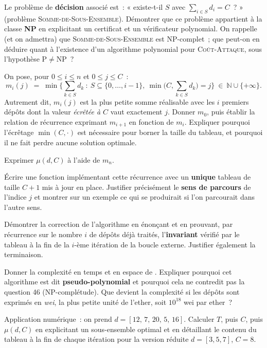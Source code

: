 \documentclass[11pt,a4paper]{article}
\begin{document}
\Q Le problème de \textbf{décision} associé est~: « existe-t-il $S$ avec
$\sum_{i\in S} d_i = C$~? » (problème \textsc{Somme-de-Sous-Ensemble}). Démontrer que ce
problème appartient à la classe \textbf{NP} en explicitant un certificat et un vérificateur
polynomial. On rappelle (et on admettra) que \textsc{Somme-de-Sous-Ensemble} est
NP-complet~; que peut-on en déduire quant à l'existence d'un algorithme polynomial pour
\textsc{Coût-Attaque}, sous l'hypothèse $\mathrm{P}\ne\mathrm{NP}$~?

\Q On pose, pour $0\le i\le n$ et $0\le j\le C$~:
\[ m_i(j) \;=\; \min\Big\{\textstyle\sum_{k\in S} d_k \ :\ S\subseteq\{0,\dots,i-1\},\
\min\big(C,\textstyle\sum_{k\in S} d_k\big) = j \Big\}\ \in\ \mathbb{N}\cup\{+\infty\}. \]
Autrement dit, $m_i(j)$ est la plus petite somme réalisable avec les $i$ premiers dépôts
dont la valeur \emph{écrêtée à $C$} vaut exactement $j$. Donner $m_0$, puis établir la
relation de récurrence exprimant $m_{i+1}$ en fonction de $m_i$. Expliquer pourquoi
l'écrêtage $\min(C,\cdot)$ est nécessaire pour borner la taille du tableau, et pourquoi il
ne fait perdre aucune solution optimale.

\Q Exprimer $\mu(d,C)$ à l'aide de $m_n$.

\Q Écrire une fonction  implémentant cette récurrence avec un
\textbf{unique} tableau de taille $C+1$ mis à jour en place. Justifier précisément le
\textbf{sens de parcours} de l'indice $j$ et montrer sur un exemple ce qui se produirait si
l'on parcourait dans l'autre sens.

\Q Démontrer la correction de l'algorithme en énonçant et en prouvant, par récurrence sur
le nombre $i$ de dépôts déjà traités, l'\textbf{invariant} vérifié par le tableau à la fin
de la $i$-ème itération de la boucle externe. Justifier également la terminaison.

\Q Donner la complexité en temps et en espace de . Expliquer
pourquoi cet algorithme est dit \textbf{pseudo-polynomial} et pourquoi cela ne contredit pas
la question 46 (NP-complétude). Que devient la complexité si les dépôts sont exprimés en
\emph{wei}, la plus petite unité de l'ether, soit $10^{18}$ wei par ether~?

\Q Application numérique~: on prend $d=[12,\,7,\,20,\,5,\,16]$. Calculer $T$, puis $C$, puis
$\mu(d,C)$ en explicitant un sous-ensemble optimal et en détaillant le contenu du tableau à
la fin de chaque itération pour la version réduite $d=[3,5,7]$, $C=8$.
\end{document}
